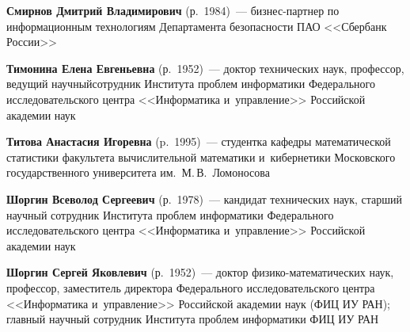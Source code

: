 \begin{multicols}{2}
\vspace*{3pt}

\noindent
\textbf{Смирнов Дмитрий Владимирович} (р.\ 1984)~--- 
биз\-нес-парт\-нер по информационным технологиям Департамента безопасности ПАО 
<<Сбербанк России>>

\vspace*{3pt}

\noindent
\textbf{Тимонина Елена Евгеньевна} (р.\ 1952)~--- 
доктор технических наук, профессор, ведущий научный\linebreak сотрудник 
Института проб\-лем информатики Федерального исследовательского центра 
<<Информатика и~управ\-ле\-ние>> Российской академии наук 

\vspace*{3pt}

\noindent
\textbf{Титова Анастасия Игоревна} (p.\ 1995)~--- 
студентка кафедры математической статистики факультета вычисли\-тельной математики 
и~кибернетики Московского государственного университета им.\ М.\,В.~Ломоносова

\vspace*{3pt}

\noindent
\textbf{Шоргин Всеволод Сергеевич} (р.\ 1978)~---
кандидат технических наук, старший научный сотрудник Института проб\-лем 
информатики Федерального исследовательского центра <<Информатика и~управ\-ле\-ние>> 
Российской академии наук

\vspace*{3pt}

\noindent
\textbf{Шоргин Сергей Яковлевич} (р.\ 1952)~--- 
доктор фи\-зи\-ко-ма\-те\-ма\-ти\-че\-ских наук, профессор, заместитель директора 
Федерального исследовательского цент\-ра <<Информатика и~управ\-ле\-ние>> 
Российской академии наук (ФИЦ ИУ РАН); главный научный сотрудник Института проб\-лем 
информатики ФИЦ ИУ РАН
 



 \label{end\stat}






\end{multicols}

\newpage